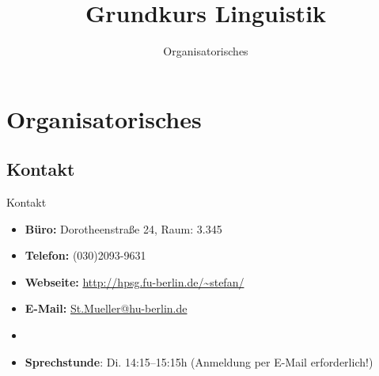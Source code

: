 
\title{Grundkurs Linguistik}

\subtitle{Organisatorisches}









	

\section{Organisatorisches}

\subsection{Kontakt}
%

\begin{frame}{Kontakt}

\begin{itemize}
	\item \textbf{Büro:} Dorotheenstraße 24, Raum: 3.345
	\item \textbf{Telefon:} (030)2093-9631
	\item \textbf{Webseite:} \url{http://hpsg.fu-berlin.de/~stefan/}
	\item \textbf{E-Mail:} \href{mailto:St.Mueller@hu-berlin.de}{St.Mueller@hu-berlin.de}
	\item[]
	\item \textbf{Sprechstunde}: Di. 14:15--15:15h (Anmeldung per E-Mail erforderlich!)
\end{itemize}	

\end{frame}

